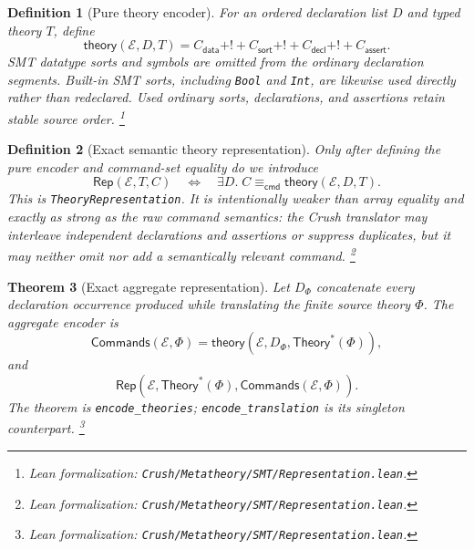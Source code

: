 \documentclass[11pt]{article}
\newtheorem{definition}{Definition}[section]
\newtheorem{theorem}[definition]{Theorem}
\theoremstyle{remark}
\newcommand{\leanfile}[1]{\footnote{Lean formalization: \texttt{Crush/Metatheory/#1}.}}
\newcommand{\Theorys}[1]{\mathsf{Theory}^{\!*}(#1)}
\newcommand{\Commands}{\mathsf{Commands}}
\newcommand{\Rep}{\mathsf{Rep}}
\newcommand{\SameCmd}{\mathrel{\equiv_{\mathsf{cmd}}}}
\begin{document}
\begin{definition}[Pure theory encoder]
For an ordered declaration list $D$ and typed theory $T$, define
\[
 \mathsf{theory}(\mathcal E,D,T)=
 C_{\mathsf{data}}\mathbin{+!+}
 C_{\mathsf{sort}}\mathbin{+!+}
 C_{\mathsf{decl}}\mathbin{+!+}
 C_{\mathsf{assert}}.
\]
SMT datatype sorts and symbols are omitted from the ordinary declaration segments.
Built-in SMT sorts, including \texttt{Bool} and \texttt{Int}, are likewise used
directly rather than redeclared.
Used ordinary sorts, declarations, and assertions retain stable source order.
\leanfile{SMT/Representation.lean}
\end{definition}

\begin{definition}[Exact semantic theory representation]
Only after defining the pure encoder and command-set equality do we introduce
\[
 \Rep(\mathcal E,T,C)
 \quad\Longleftrightarrow\quad
 \exists D.\;C\SameCmd\mathsf{theory}(\mathcal E,D,T).
\]
This is \texttt{TheoryRepresentation}. It is intentionally weaker than array
equality and exactly as strong as the raw command semantics: the Crush translator may
interleave independent declarations and assertions or suppress duplicates, but
it may neither omit nor add a semantically relevant command.
\leanfile{SMT/Representation.lean}
\end{definition}

\begin{theorem}[Exact aggregate representation]
Let $D_\Phi$ concatenate every declaration occurrence produced while
translating the finite source theory $\Phi$. The aggregate encoder is
\[
 \Commands(\mathcal E,\Phi)
 =\mathsf{theory}(\mathcal E,D_\Phi,\Theorys{\Phi}),
\]
and
\[
 \Rep(\mathcal E,\Theorys{\Phi},\Commands(\mathcal E,\Phi)).
\]
The theorem is \texttt{encode\_theories}; \texttt{encode\_translation} is its
singleton counterpart.
\leanfile{SMT/Representation.lean}
\end{theorem}
\end{document}
